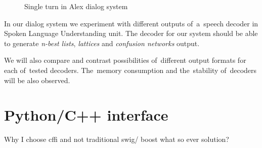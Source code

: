 \begin{figure}
    \begin{center}
    
    \caption{Single turn in Alex dialog system}
    \label{fig:dialog_system} 
    \end{center}
\end{figure}

In our dialog system we experiment with different outputs of~a~speech decoder in Spoken Language Understanding unit. 
The decoder for our system should be able to generate {\it n-best lists}, {\it lattices} and {\it confusion networks} output.




% 
% 

We will also compare and contrast possibilities of~different output formats for each of~tested decoders. The~memory consumption and the~stability of~decoders will be also observed. 




\section{Python/C++ interface} 
\label{sec:python_c_interface}
Why I choose cffi and not traditional swig/ boost what so ever solution?

